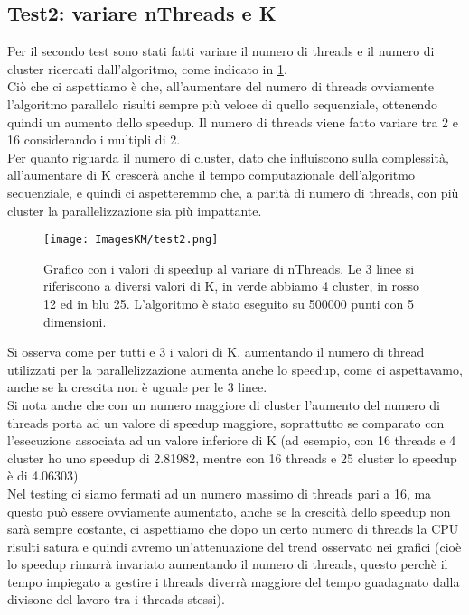 \documentclass[10pt,twocolumn,letterpaper]{article}
\begin{document}
\subsection{Test2: variare nThreads e K}
\label{sec:t2}
Per il secondo test sono stati fatti variare il numero di threads e il numero di cluster ricercati dall'algoritmo, come indicato in \cref{fig:t2}.\\
Ciò che ci aspettiamo è che, all'aumentare del numero di threads ovviamente l'algoritmo parallelo risulti sempre più veloce di quello sequenziale, ottenendo quindi un aumento dello speedup. Il numero di threads viene fatto variare tra 2 e 16 considerando i multipli di 2.\\
Per quanto riguarda il numero di cluster, dato che influiscono sulla complessità, all'aumentare di K crescerà anche il tempo computazionale dell'algoritmo sequenziale, e quindi ci aspetteremmo che, a parità di numero di threads, con più cluster la parallelizzazione sia più impattante.
\begin{figure}[h]
    \centering
    \texttt{[image: ImagesKM/test2.png]}
    \caption{Grafico con i valori di speedup al variare di nThreads. Le 3 linee si riferiscono a diversi valori di K, in verde abbiamo 4 cluster, in rosso 12 ed in blu 25. L'algoritmo è stato eseguito su 500000 punti con 5 dimensioni.}
    \label{fig:t2}
\end{figure}
Si osserva come per tutti e 3 i valori di K, aumentando il numero di thread utilizzati per la parallelizzazione aumenta anche lo speedup, come ci aspettavamo, anche se la crescita non è uguale per le 3 linee.\\
Si nota anche che con un numero maggiore di cluster l'aumento del numero di threads porta ad un valore di speedup maggiore, soprattutto se comparato con l'esecuzione associata ad un valore inferiore di K (ad esempio, con 16 threads e 4 cluster ho uno speedup di 2.81982, mentre con 16 threads e 25 cluster lo speedup è di 4.06303).\\
Nel testing ci siamo fermati ad un numero massimo di threads pari a 16, ma questo può essere ovviamente aumentato, anche se la crescità dello speedup non sarà sempre costante, ci aspettiamo che dopo un certo numero di threads la CPU risulti satura e quindi avremo un'attenuazione del trend osservato nei grafici (cioè lo speedup rimarrà invariato aumentando il numero di threads, questo perchè il tempo impiegato a gestire i threads diverrà maggiore del tempo guadagnato dalla divisone del lavoro tra i threads stessi). 
\end{document}
